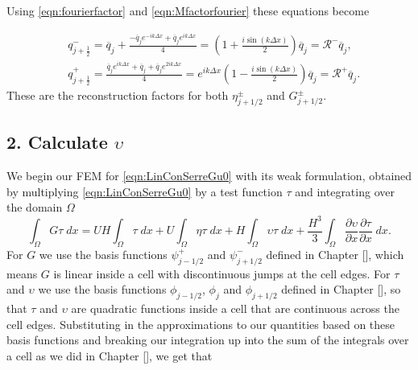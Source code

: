Using \eqref{eqn:fourierfactor} and \eqref{eqn:Mfactorfourier} these equations become

\begin{subequations}
	\label{eqn:RpmfactorFDVM}
	\begin{align}
	&q^-_{j+\frac{1}{2}} =\overline{q}_j + \frac{- \overline{q}_{j} e^{-ik\Delta x} + \overline{q}_{j} e^{ik\Delta x}}{4} = \left(1  + \frac{i\sin\left(k\Delta x\right)}{2} \right)\overline{q}_{j} =\mathcal{R}^- \overline{q}_{j},\\
	&q^+_{j+\frac{1}{2}}= \frac{\overline{q}_{j}e^{ik\Delta x} + \overline{q}_{j} + \overline{q}_{j}e^{2ik\Delta x} }{4} = e^{ik\Delta x}\left(1  - \frac{i\sin\left(k\Delta x\right)}{2} \right)\overline{q}_{j} = \mathcal{R}^+ \overline{q}_{j}.
	\end{align}
\end{subequations}
These are the reconstruction factors for both $\eta^{\pm}_{j+1/2}$ and $G^{\pm}_{j+1/2}$.

\subsection{2. Calculate $\upsilon$}
We begin our FEM for \eqref{eqn:LinConSerreGu0} with its weak formulation, obtained by multiplying \eqref{eqn:LinConSerreGu0} by a test function $\tau$ and integrating over the domain $\Omega$
\begin{equation*}
\int_{\Omega}G \tau \; dx = UH\int_{\Omega} \tau \; dx + U \int_{\Omega} \eta \tau \; dx +   H\int_{\Omega} \upsilon \tau \; dx  + \frac{H^3}{3} \int_{\Omega} \frac{\partial \upsilon}{\partial x } \frac{\partial \tau}{\partial x }\; dx.
\end{equation*}
For $G$ we use the basis functions $\psi^+_{j - 1/2}$ and $\psi^-_{j + 1/2}$ defined in Chapter [], which means $G$ is linear inside a cell with discontinuous jumps at the cell edges. For $\tau$ and $\upsilon$ we use the basis functions $\phi_{j-1/2}$, $\phi_{j}$ and $\phi_{j+1/2}$ defined in Chapter [], so that $\tau$ and $\upsilon$ are quadratic functions inside a cell that are continuous across the cell edges. Substituting in the approximations to our quantities based on these basis functions and breaking our integration up into the sum of the integrals over a cell as we did in Chapter [], we get that


